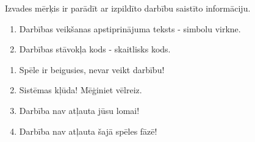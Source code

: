 {
	Izvades mērķis ir parādīt ar izpildīto darbību saistīto informāciju.
	\begin{enumerate}
		\item Darbības veikšanas apstiprinājuma teksts - simbolu virkne.
		\item Darbības stāvokļa kods - skaitlisks kods.
	\end{enumerate}
}
{
	\begin{enumerate}
		\item Spēle ir beigusies, nevar veikt darbību!
		\item Sistēmas kļūda! Mēģiniet vēlreiz.
		\item Darbība nav atļauta jūsu lomai!
		\item Darbība nav atļauta šajā spēles fāzē!
	\end{enumerate}
}

